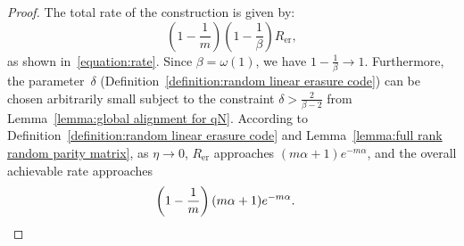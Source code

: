 \documentclass[journal,letterpaper,onecolumn,11pt]{IEEEtran}
\newcommand{\cC}{\mathcal{C}}
\newcommand{\cE}{\mathcal{E}}
\newcommand{\boldr}{\mathbf{r}}
\begin{document}
\begin{proof}
    
    
    The total rate of the construction is given by:
    \[
        \left(1-\frac{1}{m}\right)
        \left(1-\frac{1}{\beta}\right)
        R_{\mathrm{er}},
    \]
    as shown in~\eqref{equation:rate}.
    Since $\beta=\omega(1)$, we have $1-\frac{1}{\beta}\to 1$.
    Furthermore, the parameter~$\delta$ (Definition~\ref{definition:random linear erasure code}) can be chosen arbitrarily small subject to the constraint $\delta>\frac{2}{\beta-2}$ from Lemma~\ref{lemma:global alignment for qN}.
     According to Definition~\ref{definition:random linear erasure code} and Lemma~\ref{lemma:full rank random parity matrix}, as $\eta\to 0$, $R_{\mathrm{er}}$ approaches $(m\alpha+1)e^{-m\alpha}$, and the overall achievable rate approaches
    \begin{align*}    
        \left(1-\frac{1}{m}\right)
        (m\alpha+1)e^{-m\alpha}.&\qedhere
    \end{align*}
\end{proof}
\end{document}
